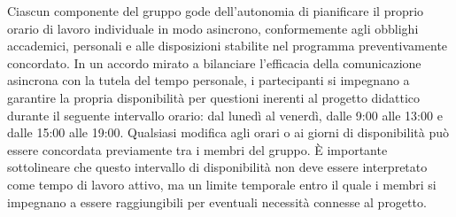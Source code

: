 Ciascun componente del gruppo gode dell'autonomia di pianificare il proprio orario di lavoro individuale in modo asincrono, conformemente agli obblighi accademici, personali e alle disposizioni stabilite nel programma preventivamente concordato.
In un accordo mirato a bilanciare l'efficacia della comunicazione asincrona con la tutela del tempo personale, i partecipanti si impegnano a garantire la propria disponibilità per questioni inerenti al progetto didattico durante il seguente intervallo orario: dal lunedì al venerdì, dalle 9:00 alle 13:00 e dalle 15:00 alle 19:00. Qualsiasi modifica agli orari o ai giorni di disponibilità può essere concordata previamente tra i membri del gruppo. È importante sottolineare che questo intervallo di disponibilità non deve essere interpretato come tempo di lavoro attivo, ma un limite temporale entro il quale i membri si impegnano a essere raggiungibili per eventuali necessità connesse al progetto.
